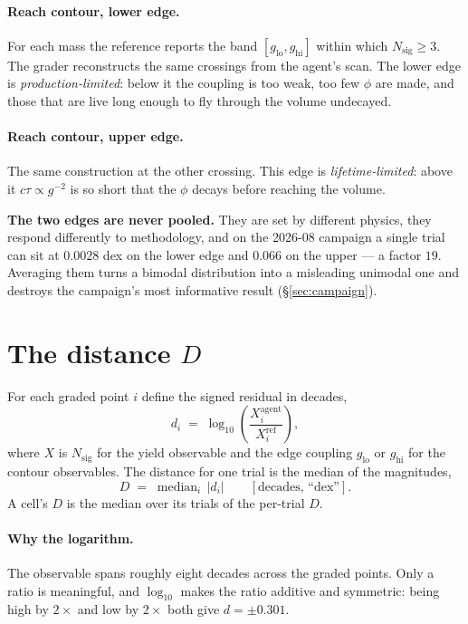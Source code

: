 \documentclass[11pt]{article}
\newcommand{\Nsig}{N_{\mathrm{sig}}}
\begin{document}
\paragraph{Reach contour, lower edge.} For each mass the reference reports the
band $[g_{\mathrm{lo}},g_{\mathrm{hi}}]$ within which $\Nsig\ge3$. The grader
reconstructs the same crossings from the agent's scan. The lower edge is
\emph{production-limited}: below it the coupling is too weak, too few $\phi$ are
made, and those that are live long enough to fly through the volume undecayed.

\paragraph{Reach contour, upper edge.} The same construction at the other
crossing. This edge is \emph{lifetime-limited}: above it $c\tau\propto g^{-2}$ is
so short that the $\phi$ decays before reaching the volume.

\medskip
\noindent
\textbf{The two edges are never pooled.} They are set by different physics, they
respond differently to methodology, and on the 2026-08 campaign a single trial
can sit at $0.0028$ dex on the lower edge and $0.066$ on the upper --- a factor
$19$. Averaging them turns a bimodal distribution into a misleading unimodal one
and destroys the campaign's most informative result (\S\ref{sec:campaign}).

\section{The distance $D$}\label{sec:D}

For each graded point $i$ define the signed residual in decades,
\begin{equation}
  d_i \;=\; \log_{10}\!\left(\frac{X^{\mathrm{agent}}_i}{X^{\mathrm{ref}}_i}\right),
\end{equation}
where $X$ is $\Nsig$ for the yield observable and the edge coupling
$g_{\mathrm{lo}}$ or $g_{\mathrm{hi}}$ for the contour observables. The distance
for one trial is the median of the magnitudes,
\begin{equation}
  D \;=\; \operatorname{median}_i\,|d_i| \qquad [\text{decades, ``dex''}].
\end{equation}
A cell's $D$ is the median over its trials of the per-trial $D$.

\paragraph{Why the logarithm.} The observable spans roughly eight decades across
the graded points. Only a ratio is meaningful, and $\log_{10}$ makes the ratio
additive and symmetric: being high by $2\times$ and low by $2\times$ both give
$d=\pm0.301$.
\end{document}
